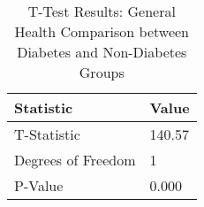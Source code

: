 
\begin{table}[h!]
\centering
\begin{tabular}{|l|l|}
\hline
\textbf{Statistic}       & \textbf{Value} \\ \hline
T-Statistic                & 140.57     \\ \hline
Degrees of Freedom          & 1          \\ \hline
P-Value                    & 0.000      \\ \hline
\end{tabular}

\vspace{0.5cm} %

\caption{T-Test Results: General Health Comparison between Diabetes and Non-Diabetes Groups}
\label{tab:t_test_general_health_results}
\end{table}
